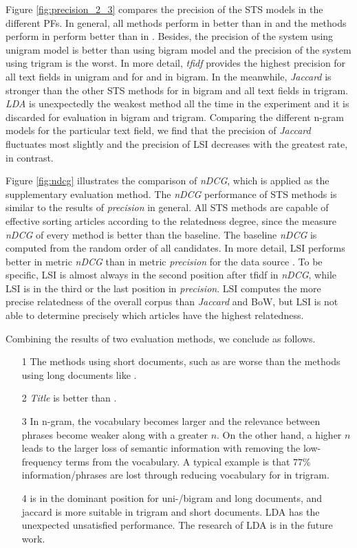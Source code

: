 Figure \ref{fig:precision_2_3} compares the precision of the STS models in the different PFs. In general, all methods perform in \icontent{} better than in \ititle{} and the methods perform in \ititle{} perform better than in \isummary{}. Besides, the precision of the system using unigram model is better than using bigram model and the precision of the system using trigram is the worst. In more detail, \textit{tfidf} provides the highest precision for all text fields in unigram and for \icontent{} and \ititle{} in bigram. In the meanwhile, \textit{Jaccard} is stronger than the other STS methods for \isummary{} in bigram and all text fields in trigram. \textit{LDA} is unexpectedly the weakest method all the time in the experiment and it is discarded for evaluation in bigram and trigram. Comparing the different n-gram models for the particular text field, we find that the precision of \textit{Jaccard} fluctuates most slightly and the precision of LSI decreases with the greatest rate, in contrast. 


Figure \ref{fig:ndcg} illustrates the comparison of \textit{nDCG}, which is applied as the supplementary evaluation method. The \textit{nDCG} performance of STS methods is similar to the results of \textit{precision} in general. All STS methods are capable of effective sorting articles according to the relatedness degree, since the measure \textit{nDCG} of every method is better than the baseline. The baseline \textit{nDCG} is computed from the random order of all candidates. In more detail, LSI performs better in metric \textit{nDCG} than in metric \textit{precision} for the data source \icontent{}. To be specific, LSI is almost always in the second position after tfidf in \textit{nDCG}, while LSI is in the third or the last position in \textit{precision}. LSI computes the more precise relatedness of the overall corpus than \textit{Jaccard} and BoW, but LSI is not able to determine precisely which articles have the highest relatedness. 


Combining the results of two evaluation methods, we conclude as follows.

\begin{itemize}
\item[1] The methods using short documents, such as \ititle{} are worse than the methods using long documents like \icontent{}. 

\item[2] \textit{Title} is better than \isummary{}.

\item[3] In n-gram, the vocabulary becomes larger and the relevance between phrases become weaker along with a greater $n$. On the other hand, a higher $n$ leads to the larger loss of semantic information with removing the low-frequency terms from the vocabulary. A typical example is that $77\%$ information/phrases are lost through reducing vocabulary for \icontent{} in trigram. 

\item[4] \tfidf{} is in the dominant position for uni-/bigram and long documents, and jaccard is more suitable in trigram and short documents. LDA has the unexpected unsatisfied performance. The research of LDA is in the future work.
\end{itemize}
 

